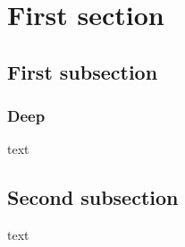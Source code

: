 \documentclass{article}
\begin{document}
\section{First section}
\subsection{First subsection}
\subsubsection{Deep}
text
\subsection{Second subsection}
text
\end{document}
